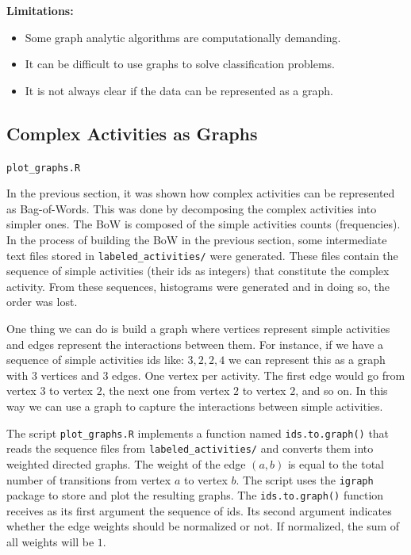\documentclass[
  11pt,
]{krantz}
\makeatletter
\providecommand{\tightlist}{%
  \setlength{\itemsep}{0pt}\setlength{\parskip}{0pt}}
\newenvironment{kframe}{%
\medskip{}
\setlength{\fboxsep}{.8em}
 \def\at@end@of@kframe{}%
 \ifinner\ifhmode%
  \def\at@end@of@kframe{\end{minipage}}%
  \begin{minipage}{\columnwidth}%
 \fi\fi%
 \def\FrameCommand##1{\hskip\@totalleftmargin \hskip-\fboxsep
 \colorbox{shadecolor}{##1}\hskip-\fboxsep
     \hskip-\linewidth \hskip-\@totalleftmargin \hskip\columnwidth}%
 \MakeFramed {\advance\hsize-\width
   \@totalleftmargin\z@ \linewidth\hsize
   \@setminipage}}%
 {\par\unskip\endMakeFramed%
 \at@end@of@kframe}
\newenvironment{rmdblock}[1]
  {
  \begin{itemize}
  \renewcommand{\labelitemi}{
    \raisebox{-.7\height}[0pt][0pt]{
      {\setkeys{Gin}{width=3em,keepaspectratio}\texttt{[image: images/icons/\#1]}}
    }
  }
  \setlength{\fboxsep}{1em}
  \begin{kframe}
  \item
  }
  {
  \end{kframe}
  \end{itemize}
  }
\newenvironment{rmdfolder}
  {\begin{rmdblock}{folder}}
  {\end{rmdblock}}
\makeatother
\begin{document}
\textbf{Limitations:}

\begin{itemize}
\tightlist
\item
  Some graph analytic algorithms are computationally demanding.
\item
  It can be difficult to use graphs to solve classification problems.
\item
  It is not always clear if the data can be represented as a graph.
\end{itemize}

\hypertarget{complex-activities-as-graphs}{%
\subsection{Complex Activities as Graphs}\label{complex-activities-as-graphs}}

\begin{rmdfolder}
\texttt{plot\_graphs.R}
\end{rmdfolder}

In the previous section, it was shown how complex activities can be represented as Bag-of-Words. This was done by decomposing the complex activities into simpler ones. The BoW is composed of the simple activities counts (frequencies). In the process of building the BoW in the previous section, some intermediate text files stored in \texttt{labeled\_activities/} were generated. These files contain the sequence of simple activities (their ids as integers) that constitute the complex activity. From these sequences, histograms were generated and in doing so, the order was lost.

One thing we can do is build a graph where vertices represent simple activities and edges represent the interactions between them. For instance, if we have a sequence of simple activities ids like: \(3,2,2,4\) we can represent this as a graph with \(3\) vertices and \(3\) edges. One vertex per activity. The first edge would go from vertex \(3\) to vertex \(2\), the next one from vertex \(2\) to vertex \(2\), and so on. In this way we can use a graph to capture the interactions between simple activities.

The script \texttt{plot\_graphs.R} implements a function named \texttt{ids.to.graph()} that reads the sequence files from \texttt{labeled\_activities/} and converts them into weighted directed graphs. The weight of the edge \((a,b)\) is equal to the total number of transitions from vertex \(a\) to vertex \(b\). The script uses the \texttt{igraph} package \citep{igraph} to store and plot the resulting graphs. The \texttt{ids.to.graph()} function receives as its first argument the sequence of ids. Its second argument indicates whether the edge weights should be normalized or not. If normalized, the sum of all weights will be \(1\).
\end{document}
